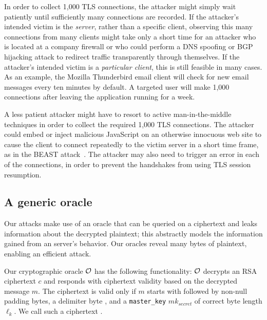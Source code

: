 \ifext
In order to collect 1,000 TLS connections, the attacker might simply wait patiently until sufficiently many connections are recorded.  If the attacker's intended victim is the \emph{server}, rather than a specific client, observing this many connections from many clients might take only a short time for an attacker who is located at a company firewall or who could perform a DNS spoofing or BGP hijacking attack to redirect traffic transparently through themselves.  If the attacker's intended victim is a \emph{particular client}, this is still feasible in many cases.  As an example, the Mozilla Thunderbird email client will check for new email messages every ten minutes by default.  A targeted user will make 1,000 connections after leaving the application running for a week.

A less patient attacker might have to resort to active man-in-the-middle techniques
in order to collect the required 1,000 TLS connections.
The attacker could embed or inject malicious JavaScript on an otherwise innocuous web site to cause the client to connect repeatedly to the victim server in a short time frame, as in the BEAST attack~\cite{beast-2011}.
The attacker may also need to trigger an error in each of the connections, in order
to prevent the handshakes from using TLS session resumption.
\fi


\subsection{A generic \ssltwo oracle}

Our attacks make use of an oracle that can be queried on a ciphertext and leaks information about the decrypted plaintext; this abstractly models the information gained from an \ssltwo server's behavior.  Our \ssltwo oracles reveal many bytes of plaintext, enabling an efficient attack.

Our cryptographic oracle $\mathcal{O}$ has the following functionality: 
$\mathcal{O}$ decrypts an RSA ciphertext $c$ and responds with ciphertext validity based on the decrypted message $m$.  
The ciphertext is valid only if $m$ starts with  followed by non-null padding bytes, a delimiter byte , and a \texttt{master\_key} $mk_{secret}$ of correct byte length $\ell_k$.
We call such a ciphertext \textit{\sslconform}.

